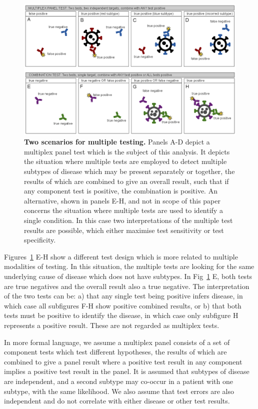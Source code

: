 \documentclass[10pt,letterpaper]{article}
\begin{document}
\begin{figure}[!ht]
\centerline{\includegraphics{fig/fig1-testerror-v2.eps}}
\caption{{\bf Two scenarios for multiple testing.}
Panels A-D depict a multiplex panel test which is the subject of this analysis. It depicts the situation where multiple tests are employed to detect multiple subtypes of disease which may be present separately or together, the results of which are combined to give an overall result, such that if any component test is positive, the combination is positive. An alternative, shown in panels E-H, and not in scope of this paper concerns the situation where multiple tests are used to identify a single condition. In this case two interpretations of the multiple test results are possible, which either maximise test sensitivity or test specificity.}
\label{fig1}
\end{figure}

Figures~\ref{fig1} E-H show a different test design which is more related to multiple modalities of testing\cite{weinstein2005}. In this situation, the multiple tests are looking for the same underlying cause of disease which does not have subtypes. In Fig~\ref{fig1} E, both tests are true negatives and the overall result also a true negative. The interpretation of the two tests can be: a) that any single test being positive infers disease, in which case all subfigures F-H show positive combined results, or b) that both tests must be positive to identify the disease, in which case only subfigure H represents a positive result. These are not regarded as multiplex tests.

In more formal language, we assume a multiplex panel consists of a set of component tests which test different hypotheses, the results of which are combined to give a panel result where a positive test result in any component implies a positive test result in the panel. It is assumed that subtypes of disease are independent, and a second subtype may co-occur in a patient with one subtype, with the same likelihood. We also assume that test errors are also independent and do not correlate with either disease or other test results.
\end{document}
